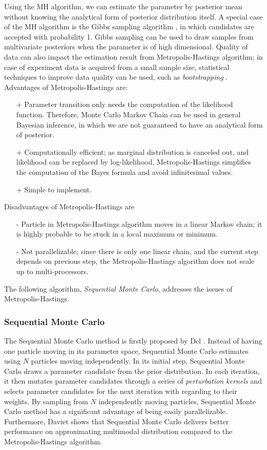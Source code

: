 Using the MH algorithm, we can estimate the parameter by posterior mean without knowing the
analytical form of posterior distribution itself. A special case of the MH algorithm is the Gibbs
sampling algorithm \cite{geman1984stochastic}, in which candidates are accepted with probability 1.
Gibbs sampling can be used to draw samples from multivariate posteriors when the parameter is of
high dimensional. Quality of data can also impact the estimation result from Metropolis-Hastings
algorithm; in case of experiment data is acquired from a small sample size, statistical techniques
to improve data quality can be used, such as \textit{bootstrapping} \cite{efron1992bootstrap}.\\
Advantages of Metropolis-Hastings are:
\begin{itemize}
    \item[+] Parameter transition only needs the computation of the likelihood function.
          Therefore, Monte Carlo Markov Chain can be used in general Bayesian inference,
          in which we are not guaranteed to have an analytical form of posterior.
    \item[+] Computationally efficient; as marginal distribution is canceled out, and likelihood can
          be replaced by log-likelihood, Metropolis-Hastings simplifies the computation of the Bayes
          formula and avoid infinitesimal values.
    \item[+] Simple to implement.
\end{itemize}
Disadvantages of Metropolis-Hastings are
\begin{enumerate}
    \item[-] Particle in Metropolis-Hastings algorithm moves in a linear Markov chain; it is highly
          probable to be stuck in a local maximum or minimum.
    \item[-] Not parallelizable; since there is only one linear chain, and the current step depends on
          previous step, the Metropolis-Hastings algorithm does not scale up to multi-processors.
\end{enumerate}
The following algorithm, \textit{Sequential Monte Carlo}, addresses the issues of Metropolis-Hastings.

\subsubsection{Sequential Monte Carlo}
The Sequential Monte Carlo method is firstly proposed by Del \cite{del2006sequential}. Instead of having
one particle moving in its parameter space, Sequential Monte Carlo estimates using $N$ particles
moving independently. In its initial step, Sequential Monte Carlo draws a parameter candidate from
the prior distribution. In each iteration, it then mutates parameter candidates through a series of
\textit{perturbation kernels} and selects parameter candidates for the next iteration with regarding
to their weights. By sampling from $N$ independently moving particles, Sequential Monte Carlo method
has a significant advantage of being easily parallelizable. Furthermore, Daviet \cite{daviet2018inference}
shows that Sequential Monte Carlo delivers better performance on approximating multimodal
distribution compared to the Metropolis-Hastings algorithm.

